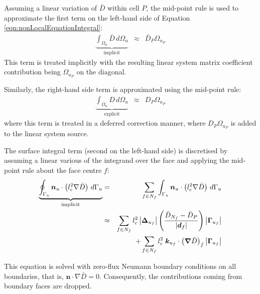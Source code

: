 \documentclass[sn-mathphys,Numbered]{sn-jnl}%
\newcommand{\bb}{\boldsymbol}
\begin{document}
Assuming a linear variation of $\bar{D}$ within cell $P$, the mid-point rule is used to approximate the first term on the left-hand side of Equation \ref{eqn:nonLocalEquationIntegral}:
\begin{eqnarray}
	\underbrace{ \int_{\Omega_u} \bar{D} \, d \Omega_u }_{\text {implicit}} &\approx& \bar{D}_P \Omega_{u_P} 
\end{eqnarray}
This term is treated implicitly with the resulting linear system matrix coefficient contribution being $\Omega_{u_P}$ on the diagonal.

Similarly, the right-hand side term is approximated using the mid-point rule:
\begin{eqnarray}
	\underbrace{ \int_{\Omega_u} D \, d \Omega_u }_{\text {explicit}} &\approx& D_P \Omega_{u_P} 
\end{eqnarray}
where this term is treated in a deferred correction manner, where $ D_P \Omega_{u_P} $ is added to the linear system source.

The surface integral term (second on the left-hand side) is discretised by assuming a linear various of the integrand over the face and applying the mid-point rule about the face centre $f$:
\begin{eqnarray}
	\underbrace{ \oint_{\mathrm{\Gamma}_u}  \bb{n}_u \cdot \left( l_c^2 \nabla \bar{D} \right) \,  d\mathrm{\Gamma}_u }_{\text {implicit}}
		&=&
		\sum_{f \in N_f} \int_{\mathrm{\Gamma}_u}  \bb{n}_u \cdot \left( l_c^2 \nabla \bar{D} \right) \,  d\mathrm{\Gamma}_u \notag \\
		&\approx&
		\sum_{f \in N_f} l_c^2 \left|\boldsymbol{\Delta}_{u_f}\right|\left(\frac{\bar{D}_{N_f} - \bar{D}_P}{\left|\bb{d}_f\right|}\right)\left|\bb{\Gamma}_{u_f}\right| \notag \\
		    &&+ \sum_{f \in N_f} l_c^2 \; \bb{k}_{u_f} \cdot
		    \left(  \boldsymbol{\nabla} \bar{D}   \right)_f
		    \left|\bb{\Gamma}_{u_f}\right|
\end{eqnarray}

This equation is solved with zero-flux Neumann boundary conditions on all boundaries, that is,  $\bb{n} \cdot \nabla \bar{D} = 0$.
Consequently, the contributions coming from boundary faces are dropped.
\end{document}
